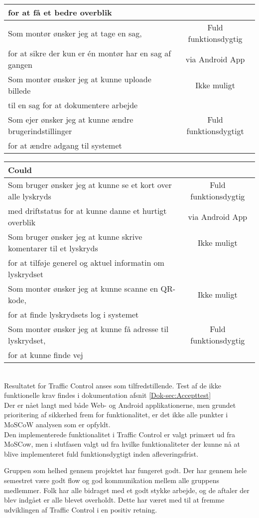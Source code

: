 \begin{tabular}{ l | c  }
	for at få et bedre overblik & \\
	\hline
	Som montør ønsker jeg at tage en sag, & Fuld funktionsdygtig\\
	for at sikre der kun er én montør har en sag af gangen & via Android App\\
	\hline
	Som montør ønsker jeg at kunne uploade billede & Ikke muligt\\
	til en sag for at dokumentere arbejde &\\
	\hline
	Som ejer ønsker jeg at kunne ændre brugerindstillinger & Fuld funktionsdygtigt\\
	for at ændre adgang til systemet &\\
	\hline
\end{tabular}

\begin{tabular}{ l | c  }
	\hline
	\textbf{Could} & \\ \hline
	Som bruger ønsker jeg at kunne se et kort over alle lyskryds & Fuld funktionsdygtig\\
	med driftstatus for at kunne danne et hurtigt overblik & via Android App\\
	\hline
	Som bruger ønsker jeg at kunne skrive komentarer til et lyskryds & Ikke muligt\\
	for at tilføje generel og aktuel informatin om lyskrydset &\\
	\hline
	Som montør ønsker jeg at kunne scanne en QR-kode, & Ikke muligt\\
	for at finde lyskrydsets log i systemet &\\
	\hline
	Som montør ønsker jeg at kunne få adresse til lyskrydset, & Fuld funktionsdygtig\\
	for at kunne finde vej &\\
	\hline
\end{tabular} \\

Resultatet for Traffic Control anses som tilfredstillende. Test af de ikke funktionelle krav findes i dokumentation afsnit \vref{Dok-sec:Accepttest} \\
Der er nået langt med både Web- og Android applikationerne, men grundet prioritering af sikkerhed frem for funktionalitet, er det ikke alle punkter i MoSCoW analysen som er opfyldt. \\
Den implementerede funktionalitet i Traffic Control er valgt primært ud fra MoSCow, men i slutfasen valgt ud fra hvilke funktionaliteter der kunne nå at blive implementeret fuld funktionsdygtigt inden afleveringsfrist.

Gruppen som helhed gennem projektet har fungeret godt. Der har gennem hele semestret være godt flow og god kommunikation mellem alle gruppens medlemmer. Folk har alle bidraget med et godt stykke arbejde, og de aftaler der blev indgået er alle blevet overholdt. Dette har været med til at fremme udviklingen af Traffic Control i en positiv retning.
